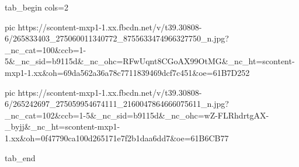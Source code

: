  
 
 
 
 


\ifcmt
  tab_begin cols=2

     pic https://scontent-mxp1-1.xx.fbcdn.net/v/t39.30808-6/265833403_275060011340772_8755633474966327750_n.jpg?_nc_cat=100&ccb=1-5&_nc_sid=b9115d&_nc_ohc=RFwUqnt8CGoAX99OtMG&_nc_ht=scontent-mxp1-1.xx&oh=69da562a36a78c7711839469dcf7c451&oe=61B7D252

     pic https://scontent-mxp1-1.xx.fbcdn.net/v/t39.30808-6/265242697_275059954674111_2160047864666075611_n.jpg?_nc_cat=102&ccb=1-5&_nc_sid=b9115d&_nc_ohc=wZ-FLRhdrtgAX-_byjj&_nc_ht=scontent-mxp1-1.xx&oh=0f47790ca100d265171e7f2b1daa6dd7&oe=61B6CB77

  tab_end
\fi
